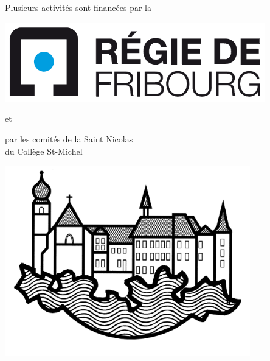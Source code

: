 \cleardoublepage

\begin{center}
{\Huge Plusieurs activités sont financées par la}
\vspace*{5mm}
\par
\includegraphics[width=0.85\textwidth]{regie_fribourg.pdf}
\end{center}

\vfill
\begin{center}
	{\Huge et}
\end{center}
\vfill

\begin{center}
{\Huge par les comités de la Saint Nicolas\vspace*{1mm}\\
du Collège St-Michel}
\vspace*{5mm}
\par
\includegraphics[width=0.8\textwidth]{csm.jpg}
\end{center}


